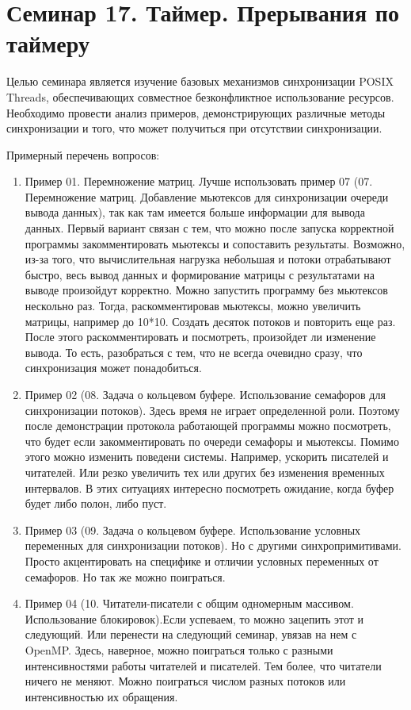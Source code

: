 \chapter[17]{Семинар 17. Таймер. Прерывания по таймеру}

Целью семинара является изучение базовых механизмов синхронизации POSIX Threads, обеспечивающих совместное безконфликтное использование ресурсов. Необходимо провести анализ примеров, демонстрирующих различные методы синхронизации и того, что может получиться при отсутствии синхронизации.

Примерный перечень вопросов:
\begin{enumerate}
    \item Пример 01. Перемножение матриц.  Лучше использовать пример 07 (07. Перемножение матриц. Добавление мьютексов для синхронизации очереди вывода данных), так как там имеется больше информации для вывода данных. Первый вариант связан с тем, что можно после запуска корректной программы закомментировать мьютексы и сопоставить результаты. Возможно, из-за того, что вычислительная нагрузка небольшая и потоки отрабатывают быстро, весь вывод данных и формирование матрицы с результатами на выводе произойдут корректно. Можно запустить программу без мьютексов нескольно раз. Тогда, раскомментировав мьютексы, можно увеличить матрицы, например до 10*10. Создать десяток потоков и повторить еще раз. После этого раскомментировать и посмотреть, произойдет ли изменение вывода. То есть, разобраться с тем, что не всегда очевидно сразу, что синхронизация может понадобиться.
    \item Пример 02 (08. Задача о кольцевом буфере. Использование семафоров для синхронизации потоков). Здесь время не играет определенной роли. Поэтому после демонстрации протокола работающей программы можно посмотреть, что будет если закомментировать по очереди семафоры и мьютексы. Помимо этого можно изменить поведени системы. Например, ускорить писателей и читателей. Или резко увеличить тех или других без изменения временных интервалов. В этих ситуациях интересно посмотреть ожидание, когда буфер будет либо полон, либо пуст.
    \item Пример 03 (09. Задача о кольцевом буфере. Использование условных переменных для синхронизации потоков). Но с другими синхропримитивами. Просто акцентировать на специфике и отличии условных переменных от семафоров. Но так же можно поиграться.
    \item Пример 04 (10. Читатели-писатели с общим одномерным массивом. Использование блокировок).Если успеваем, то можно зацепить этот и следующий. Или перенести на следующий семинар, увязав на нем с OpenMP. Здесь, наверное, можно поиграться только с разными интенсивностями работы читателей и писателей. Тем более, что читатели ничего не меняют. Можно поиграться числом разных потоков или интенсивностью их обращения.

\end{enumerate}
